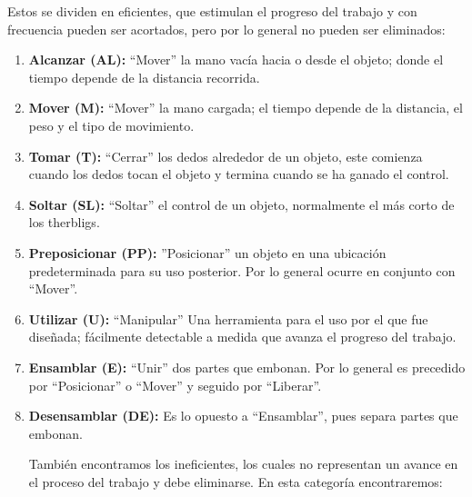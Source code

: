     Estos se dividen en eficientes, que estimulan el progreso del trabajo y con frecuencia pueden ser acortados, pero por lo general no pueden ser eliminados:
    \begin{enumerate}
        \item \textbf{Alcanzar (AL):} “Mover” la mano vacía hacia o desde el objeto; donde el tiempo depende de la distancia recorrida.
        \item \textbf{Mover (M):} “Mover” la mano cargada; el tiempo depende de la distancia, el peso y el tipo de movimiento.
        \item \textbf{Tomar (T):} “Cerrar” los dedos alrededor de un objeto, este comienza cuando los dedos tocan el objeto y termina cuando se ha ganado el control.
        \item \textbf{Soltar (SL):} “Soltar” el control de un objeto, normalmente el más corto de los therbligs.
        \item \textbf{Preposicionar (PP):} ”Posicionar” un objeto en una ubicación predeterminada para su uso posterior. Por lo general ocurre en conjunto con “Mover”.
        \item \textbf{Utilizar (U):} “Manipular” Una herramienta para el uso por el que fue diseñada; fácilmente detectable a medida que avanza el progreso del trabajo.
        \item \textbf{Ensamblar (E):} “Unir” dos partes que embonan. Por lo general es precedido por “Posicionar” o “Mover” y seguido por “Liberar”.
        \item \textbf{Desensamblar (DE):} Es lo opuesto a “Ensamblar”, pues separa partes que embonan.
    
     También encontramos los ineficientes, los cuales no representan un avance en el proceso del trabajo y debe eliminarse. En esta categoría encontraremos:
    

\end{enumerate}

